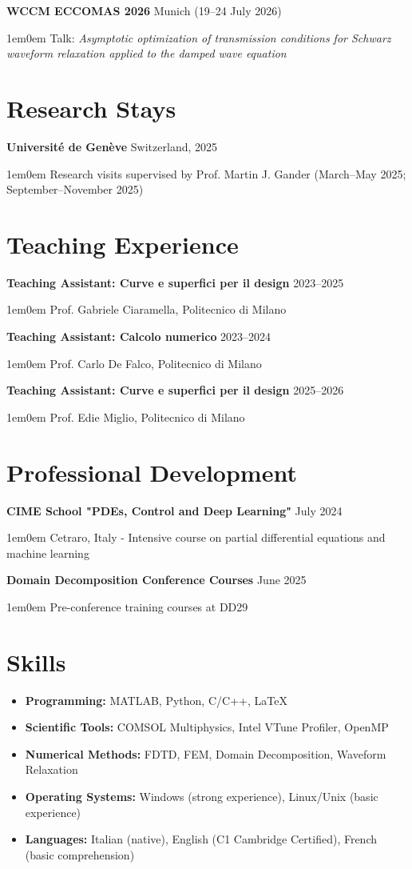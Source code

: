 \documentclass[11pt,a4paper]{article}
\newcommand{\cvdetail}[1]{%
  \begin{adjustwidth}{1em}{0em}
    #1
  \end{adjustwidth}%
  \vspace{0.5em}%
}
\newcommand{\cvsubitem}[2]{%
  \vspace{0.3em}%
  \noindent\textbf{#1} \hfill #2%
  \vspace{0.2em}%
}
\begin{document}
\cvsubitem{WCCM ECCOMAS 2026}{Munich (19--24 July 2026)}
\cvdetail{Talk: \textit{Asymptotic optimization of transmission conditions for Schwarz waveform relaxation applied to the damped wave equation}}

\section{Research Stays}

\cvsubitem{Université de Genève}{Switzerland, 2025}
\cvdetail{Research visits supervised by Prof. Martin J. Gander (March--May 2025; September--November 2025)}

\section{Teaching Experience}

\cvsubitem{Teaching Assistant: Curve e superfici per il design}{2023--2025}
\cvdetail{Prof. Gabriele Ciaramella, Politecnico di Milano}

\cvsubitem{Teaching Assistant: Calcolo numerico}{2023--2024}
\cvdetail{Prof. Carlo De Falco, Politecnico di Milano}

\cvsubitem{Teaching Assistant: Curve e superfici per il design}{2025--2026}
\cvdetail{Prof. Edie Miglio, Politecnico di Milano}

\section{Professional Development}

\cvsubitem{CIME School "PDEs, Control and Deep Learning"}{July 2024}
\cvdetail{Cetraro, Italy - Intensive course on partial differential equations and machine learning}

\cvsubitem{Domain Decomposition Conference Courses}{June 2025}
\cvdetail{Pre-conference training courses at DD29}

\section{Skills}

\begin{itemize}
  \item \textbf{Programming:} MATLAB, Python, C/C++, \LaTeX
  \item \textbf{Scientific Tools:} COMSOL Multiphysics, Intel VTune Profiler, OpenMP
  \item \textbf{Numerical Methods:} FDTD, FEM, Domain Decomposition, Waveform Relaxation
  \item \textbf{Operating Systems:} Windows (strong experience), Linux/Unix (basic experience)
  \item \textbf{Languages:} Italian (native), English (C1 Cambridge Certified), French (basic comprehension)
\end{itemize}
\end{document}
